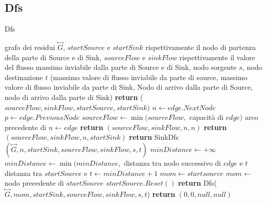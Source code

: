 \documentclass{article}
\begin{document}
\subsection{Dfs}
\begin{algorithm}
\caption{Dfs}
\begin{algorithmic}[1]
\REQUIRE grafo dei residui $\overset{\leftrightarrow}{G}$, $startSource$ e $startSink$ rispettivamente il nodo di partenza della parte di Source e di Sink, $sourceFlow$ e $sinkFlow$ rispettivamente il valore del flusso massimo inviabile dalla parte di Source e di Sink, nodo sorgente $s$, nodo destinazione $t$
\ENSURE (massimo valore di flusso inviabile da parte di source, massimo valore di flusso inviabile da parte di Sink, Nodo di arrivo dalla parte di Source, nodo di arrivo dalla parte di Sink)
\STATE \textbf{return} ($sourceFlow,sinkFlow,startSource,startSink)$ 
\ENDIF
{}
\STATE $n \leftarrow edge.NextNode$
\STATE $p \leftarrow edge.PreviousNode$
\STATE $sourceFlow \leftarrow \min(sourceFlow,$ capacità di $edge)$
\STATE arco precedente di $ n \leftarrow edge$ 
\STATE \textbf{return}  $(sourceFlow, sinkFlow,n,n)$
\ENDIF
{}
\STATE \textbf{return} $(sourceFlow,sinkFlow,n,startSink)$
\ENDIF
\STATE \textbf{return} SinkDfs$(\overset{\leftrightarrow}{G},n, startSink, sourceFlow, sinkFlow,s,t)$
\ENDIF
\ENDFOR
\STATE $minDistance \leftarrow +\infty$
\STATE $minDistance \leftarrow \min(minDistance,$ distanza tra nodo successivo di $edge$ e $t$
\ENDIF
\ENDFOR
\STATE distanza tra $startSource$ e $t \leftarrow minDistance+1$
\STATE $mom \leftarrow startsource$
\ELSE
\STATE $mom \leftarrow $ nodo precedente di $startSource$ 
\ENDIF
\STATE $startSource.Reset()$
\STATE \textbf{return} Dfs($\overset{\leftrightarrow}{G},mom, startSink, sourceFlow, sinkFlow,s,t$)
\ENDIF 
\STATE \textbf{return} $(0,0,null,null)$
\end{algorithmic}
\end{algorithm}
\end{document}
